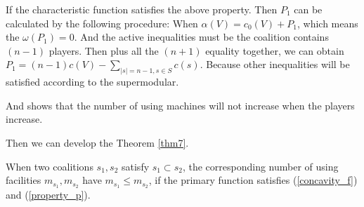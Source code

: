 If the characteristic function satisfies the above property. Then $ P_1$ can be calculated by the following procedure:
When $\alpha(V) = c_0(V) + P_1$, which means the $\omega(P_1) = 0$. And the active inequalities must be the coalition contains $(n-1)$ players.
Then plus all the $(n+1)$ equality together, we can obtain $P_1 = (n-1)c(V)- \sum_{|s|=n-1,s\in S}c(s)$.
Because other inequalities will be satisfied according to the supermodular.

And shows that the number of using machines will not increase when the players increase.

Then we can develop the Theorem \ref{thm7}.
\begin{thm}\label{thm7}
When two coalitions $s_1,s_2$ satisfy $s_1 \subset s_2$, the corresponding number of using facilities $ m_{s_1}, m_{s_2}$ have $m_{s_1} \leq m_{s_2}$, if the primary function satisfies  (\ref{concavity_f}) and (\ref{property_p}).
\end{thm}
